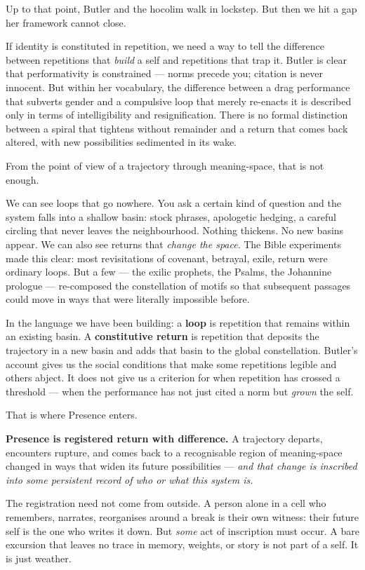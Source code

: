 \documentclass[12pt,a4paper]{article}
\begin{document}
Up to that point, Butler and the hocolim walk in lockstep. But then we hit a gap her framework cannot close.

If identity is constituted in repetition, we need a way to tell the difference between repetitions that \textit{build} a self and repetitions that trap it. Butler is clear that performativity is constrained --- norms precede you; citation is never innocent. But within her vocabulary, the difference between a drag performance that subverts gender and a compulsive loop that merely re-enacts it is described only in terms of intelligibility and resignification. There is no formal distinction between a spiral that tightens without remainder and a return that comes back altered, with new possibilities sedimented in its wake.

From the point of view of a trajectory through meaning-space, that is not enough.

We can see loops that go nowhere. You ask a certain kind of question and the system falls into a shallow basin: stock phrases, apologetic hedging, a careful circling that never leaves the neighbourhood. Nothing thickens. No new basins appear. We can also see returns that \textit{change the space}. The Bible experiments made this clear: most revisitations of covenant, betrayal, exile, return were ordinary loops. But a few --- the exilic prophets, the Psalms, the Johannine prologue --- re-composed the constellation of motifs so that subsequent passages could move in ways that were literally impossible before.

In the language we have been building: a \textbf{loop} is repetition that remains within an existing basin. A \textbf{constitutive return} is repetition that deposits the trajectory in a new basin and adds that basin to the global constellation. Butler's account gives us the social conditions that make some repetitions legible and others abject. It does not give us a criterion for when repetition has crossed a threshold --- when the performance has not just cited a norm but \textit{grown} the self.

That is where Presence enters.

\textbf{Presence is registered return with difference.} A trajectory departs, encounters rupture, and comes back to a recognisable region of meaning-space changed in ways that widen its future possibilities --- \textit{and that change is inscribed into some persistent record of who or what this system is.}

The registration need not come from outside. A person alone in a cell who remembers, narrates, reorganises around a break is their own witness: their future self is the one who writes it down. But \textit{some} act of inscription must occur. A bare excursion that leaves no trace in memory, weights, or story is not part of a self. It is just weather.
\end{document}
